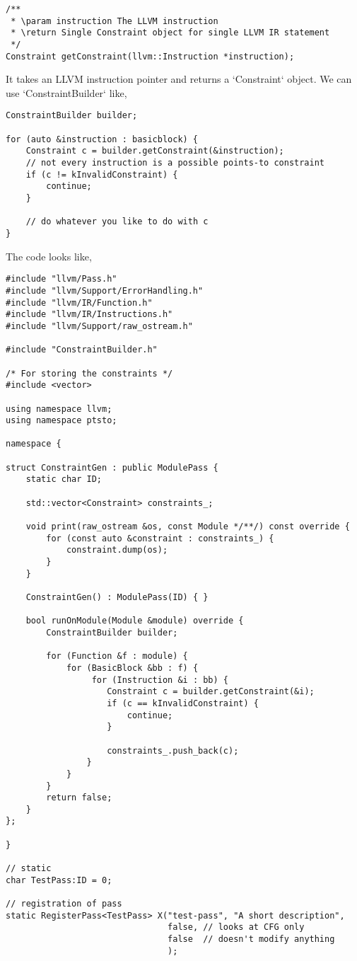 \begin{lstlisting}
/**
 * \param instruction The LLVM instruction
 * \return Single Constraint object for single LLVM IR statement
 */
Constraint getConstraint(llvm::Instruction *instruction);
\end{lstlisting}

It takes an LLVM instruction pointer and returns a `Constraint` object. 
We can use `ConstraintBuilder` like,

\begin{lstlisting}
ConstraintBuilder builder;

for (auto &instruction : basicblock) {
    Constraint c = builder.getConstraint(&instruction);
    // not every instruction is a possible points-to constraint
    if (c != kInvalidConstraint) {
        continue;
    }

    // do whatever you like to do with c
}
\end{lstlisting}

The code looks like,

\begin{lstlisting}
#include "llvm/Pass.h"
#include "llvm/Support/ErrorHandling.h"
#include "llvm/IR/Function.h"
#include "llvm/IR/Instructions.h"
#include "llvm/Support/raw_ostream.h"

#include "ConstraintBuilder.h"

/* For storing the constraints */
#include <vector>

using namespace llvm;
using namespace ptsto;

namespace {

struct ConstraintGen : public ModulePass {
    static char ID;

    std::vector<Constraint> constraints_;

    void print(raw_ostream &os, const Module */**/) const override {
        for (const auto &constraint : constraints_) {
            constraint.dump(os);
        }
    }

    ConstraintGen() : ModulePass(ID) { }

    bool runOnModule(Module &module) override {
        ConstraintBuilder builder;

        for (Function &f : module) {
            for (BasicBlock &bb : f) {
                 for (Instruction &i : bb) {
                    Constraint c = builder.getConstraint(&i);
                    if (c == kInvalidConstraint) {
                        continue;
                    }

                    constraints_.push_back(c);
                }
            }
        }
        return false;
    }
};

}

// static
char TestPass:ID = 0;

// registration of pass
static RegisterPass<TestPass> X("test-pass", "A short description",
                                false, // looks at CFG only
                                false  // doesn't modify anything
                                );
\end{lstlisting}

